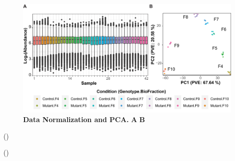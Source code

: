\documentclass[11pt]{elife}\usepackage[]{graphicx}\usepackage[]{color}
\begin{document}
\begin{figure}[h] %
  \begin{fullwidth}
  \begin{center}
	  \includegraphics[width=0.9\paperwidth,keepaspectratio]{normalization}
	  \caption{\textbf{Data Normalization and PCA.} \textbf{A} \textbf{B} }
	  \label{fig:normalization}
  \end{center}
  \end{fullwidth}
\end{figure}



()

()
\end{document}
